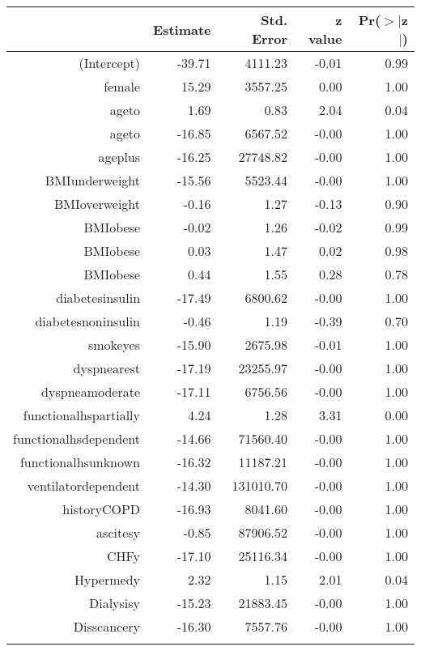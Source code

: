 \bigskip\bigskip
\centering
\begin{tabular}{rrrrr}
  \hline
 & Estimate & Std. Error & z value & Pr($>$$|$z$|$) \\ 
  \hline
(Intercept) & -39.71 & 4111.23 & -0.01 & 0.99 \\ 
  female & 15.29 & 3557.25 & 0.00 & 1.00 \\ 
  age\-65\-to\-74 & 1.69 & 0.83 & 2.04 & 0.04 \\ 
  age\-75\-to\-84 & -16.85 & 6567.52 & -0.00 & 1.00 \\ 
  age\-85\-plus & -16.25 & 27748.82 & -0.00 & 1.00 \\ 
  BMI\-underweight & -15.56 & 5523.44 & -0.00 & 1.00 \\ 
  BMI\-overweight & -0.16 & 1.27 & -0.13 & 0.90 \\ 
  BMI\-obese\-1 & -0.02 & 1.26 & -0.02 & 0.99 \\ 
  BMI\-obese\-2 & 0.03 & 1.47 & 0.02 & 0.98 \\ 
  BMI\-obese\-3 & 0.44 & 1.55 & 0.28 & 0.78 \\ 
  diabetes\-insulin & -17.49 & 6800.62 & -0.00 & 1.00 \\ 
  diabetes\-noninsulin & -0.46 & 1.19 & -0.39 & 0.70 \\ 
  smoke\-yes & -15.90 & 2675.98 & -0.01 & 1.00 \\ 
  dyspnea\-rest & -17.19 & 23255.97 & -0.00 & 1.00 \\ 
  dyspnea\-moderate & -17.11 & 6756.56 & -0.00 & 1.00 \\ 
  functional\-hs\-partially & 4.24 & 1.28 & 3.31 & 0.00 \\ 
  functional\-hs\-dependent & -14.66 & 71560.40 & -0.00 & 1.00 \\ 
  functional\-hs\-unknown & -16.32 & 11187.21 & -0.00 & 1.00 \\ 
  ventilator\-dependent & -14.30 & 131010.70 & -0.00 & 1.00 \\ 
  history\-COPD & -16.93 & 8041.60 & -0.00 & 1.00 \\ 
  ascites\-y & -0.85 & 87906.52 & -0.00 & 1.00 \\ 
  CHF\-y & -17.10 & 25116.34 & -0.00 & 1.00 \\ 
  Hyper\-med\-y & 2.32 & 1.15 & 2.01 & 0.04 \\ 
  Dialysis\-y & -15.23 & 21883.45 & -0.00 & 1.00 \\ 
  Diss\-cancer\-y & -16.30 & 7557.76 & -0.00 & 1.00 \\ 
$$
\end{tabular}
